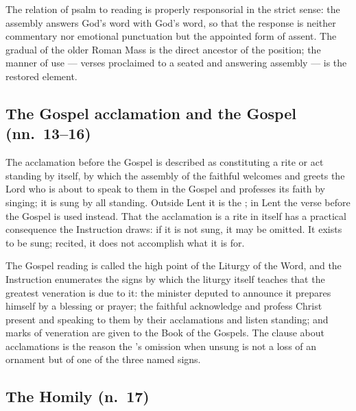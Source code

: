 The relation of psalm to reading is properly responsorial in the strict sense: the assembly
answers God's word with God's word, so that the response is neither commentary nor emotional
punctuation but the appointed form of assent. The gradual of the older Roman Mass is the direct
ancestor of the position; the manner of use --- verses proclaimed to a seated and answering
assembly --- is the restored element.

\subsection{The Gospel acclamation and the Gospel (nn.\ 13--16)}

The acclamation before the Gospel is described as constituting a rite or act standing by
itself, by which the assembly of the faithful welcomes and greets the Lord who is about to
speak to them in the Gospel and professes its faith by singing; it is sung by all standing.
Outside Lent it is the ; in Lent the verse before the Gospel is used
instead. That the acclamation is a rite in itself
has a practical consequence the Instruction draws: if it is not sung, it may be omitted. It
exists to be sung; recited, it does not accomplish what it is for.

The Gospel reading is called the high point of the Liturgy of the Word, and the Instruction
enumerates the signs by which the liturgy itself teaches that the greatest veneration is due to
it: the minister deputed to announce it prepares himself by a blessing or prayer; the faithful
acknowledge and profess Christ present and speaking to them by their acclamations and listen
standing; and marks of veneration are given to the Book of the Gospels. The clause about acclamations is the reason the
's omission when unsung is not a loss of an ornament but of one of the three
named signs.

\subsection{The Homily (n.\ 17)}

